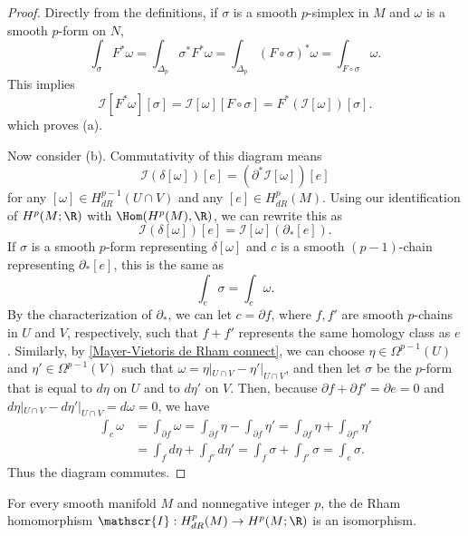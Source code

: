 \begin{proof}
Directly from the definitions, if $\sigma$ is a smooth $p$-simplex in $M$ and $\omega$ is a smooth $p$-form on $N$,
\[\int_{\sigma}F^*\omega=\int_{\Delta_p}\sigma^*F^*\omega=\int_{\Delta_p}(F\circ\sigma)^*\omega=\int_{F\circ\sigma}\omega.\]
This implies
\[\mathscr{I}[F^*\omega][\sigma]=\mathscr{I}[\omega][F\circ\sigma]=F^*(\mathscr{I}[\omega])[\sigma].\]
which proves (a).\par
Now consider (b). Commutativity of this diagram means
\[\mathscr{I}(\delta[\omega])[e]=(\partial^*\mathscr{I}[\omega])[e]\]
for any $[\omega]\in H^{p-1}_{dR}(U\cap V)$ and any $[e]\in H^p_{dR}(M)$. Using our identification of $H^p(M;\R)$ with $\Hom(H^p(M),\R)$, we can rewrite this as
\[\mathscr{I}(\delta[\omega])[e]=\mathscr{I}[\omega](\partial_*[e]).\]
If $\sigma$ is a smooth $p$-form representing $\delta[\omega]$ and $c$ is a smooth $(p-1)$-chain representing $\partial_*[e]$, this is the same as 
\[\int_e\sigma=\int_c\omega.\]
By the characterization of $\partial_*$, we can let $c=\partial f$, where $f,f'$ are smooth $p$-chains in $U$ and $V$, respectively, such that $f+f'$ represents the 
same homology class as $e$. Similarly, by \cref{Mayer-Vietoris de Rham connect}, we can choose $\eta\in\Omega^{p-1}(U)$ and $\eta'\in\Omega^{p-1}(V)$ such that $\omega=\eta|_{U\cap V}-\eta'|_{U\cap V}$, 
and then let $\sigma$ be the $p$-form that is equal to $d\eta$ on $U$ and to $d\eta'$ on $V$. Then, because $\partial f+\partial f'=\partial e=0$ and $d\eta|_{U\cap V}-d\eta'|_{U\cap V}=d\omega=0$, 
we have
\begin{align*}
\int_{c}\omega&=\int_{\partial f}\omega=\int_{\partial f}\eta-\int_{\partial f}\eta'=\int_{\partial f}\eta+\int_{\partial f'}\eta'\\
&=\int_{f}d\eta+\int_{f'}d\eta'=\int_f\sigma+\int_{f'}\sigma=\int_{e}\sigma.
\end{align*}
Thus the diagram commutes.
\end{proof}
\begin{theorem}
For every smooth manifold $M$ and nonnegative integer $p$, the de Rham homomorphism $\mathscr{I}:H^p_{dR}(M)\to H^p(M;\R)$ is an isomorphism.
\end{theorem}
